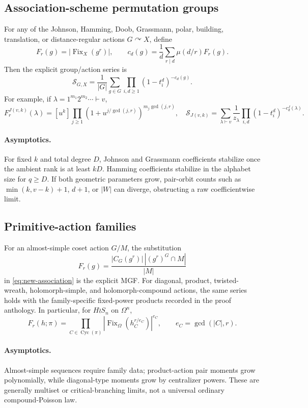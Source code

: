 \documentclass[10pt]{article}
\newcommand{\Fix}{\operatorname{Fix}}
\newcommand{\MGF}{\mathcal S}
\newcommand{\Cyc}{\operatorname{Cyc}}
\begin{document}
\subsection{Association-scheme permutation groups}
For any of the Johnson, Hamming, Doob, Grassmann, polar, building, translation,
or distance-regular actions $G\curvearrowright X$, define
\[
 F_r(g)=|\Fix_X(g^r)|,\qquad
 c_d(g)=\frac1d\sum_{r\mid d}\mu(d/r)F_r(g).
\]
Then the explicit group/action series is
\begin{equation}\label{eq:new-association}
 \boxed{\MGF_{G,X}=\frac1{|G|}\sum_{g\in G}
 \prod_{i,d\ge1}(1-t_i^d)^{-c_d(g)}.}
\end{equation}
For example, if $\lambda=1^{m_1}2^{m_2}\cdots\vdash v$,
\[
 F_r^{J(v,k)}(\lambda)=[u^k]\prod_{j\ge1}
 (1+u^{j/\gcd(j,r)})^{m_j\gcd(j,r)},
\quad
 \MGF_{J(v,k)}=\sum_{\lambda\vdash v}\frac1{z_\lambda}
 \prod_{i,d}(1-t_i^d)^{-c_d^J(\lambda)}.
\]
\paragraph{Asymptotics.}
For fixed $k$ and total degree $D$, Johnson and Grassmann coefficients stabilize
once the ambient rank is at least $kD$.  Hamming coefficients stabilize in the
alphabet size for $q\ge D$.  If both geometric parameters grow, pair-orbit
counts such as $\min(k,v-k)+1$, $d+1$, or $|W|$ can diverge, obstructing a raw
coefficientwise limit.

\subsection{Primitive-action families}
For an almost-simple coset action $G/M$, the substitution
\[
 F_r(g)=\frac{|C_G(g^r)|\,|(g^r)^G\cap M|}{|M|}
\]
in \eqref{eq:new-association} is the explicit MGF.  For diagonal, product,
twisted-wreath, holomorph-simple, and holomorph-compound actions, the same
series holds with the family-specific fixed-power products recorded in the
proof anthology.  In particular, for $H\wr S_n$ on $\Omega^n$,
\[
 F_r(h;\pi)=\prod_{C\in\Cyc(\pi)}
 |\Fix_\Omega(h_C^{r/e_C})|^{e_C},\qquad e_C=\gcd(|C|,r).
\]
\paragraph{Asymptotics.}
Almost-simple sequences require family data; product-action pair moments grow
polynomially, while diagonal-type moments grow by centralizer powers.  These
are generally multiset or critical-branching limits, not a universal ordinary
compound-Poisson law.
\end{document}
